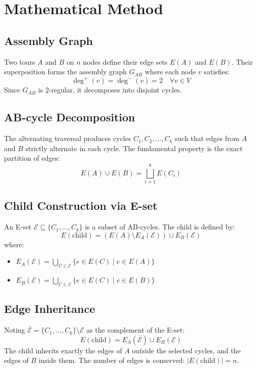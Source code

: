 \documentclass{article}
\begin{document}
\section{Mathematical Method}

\subsection{Assembly Graph}
Two tours $A$ and $B$ on $n$ nodes define their edge sets $E(A)$ and $E(B)$. Their superposition forms the assembly graph $G_{AB}$ where each node $v$ satisfies:
$$\deg^+(v) = \deg^-(v) = 2 \quad \forall v \in V$$
Since $G_{AB}$ is 2-regular, it decomposes into disjoint cycles.

\subsection{AB-cycle Decomposition}
The alternating traversal produces cycles $C_1, C_2, \dots, C_k$ such that edges from $A$ and $B$ strictly alternate in each cycle. The fundamental property is the exact partition of edges:
$$E(A) \cup E(B) = \bigsqcup_{i=1}^{k} E(C_i)$$

\subsection{Child Construction via E-set}
An E-set $\mathcal{E} \subseteq \{C_1, \dots, C_k\}$ is a subset of AB-cycles. The child is defined by:
$$E(\text{child}) = (E(A) \setminus E_A(\mathcal{E})) \cup E_B(\mathcal{E})$$
where:
\begin{itemize}
    \item $E_A(\mathcal{E}) = \bigcup_{C \in \mathcal{E}} \{e \in E(C) \mid e \in E(A)\}$
    \item $E_B(\mathcal{E}) = \bigcup_{C \in \mathcal{E}} \{e \in E(C) \mid e \in E(B)\}$
\end{itemize}

\subsection{Edge Inheritance}
Noting $\bar{\mathcal{E}} = \{C_1, \dots, C_k\} \setminus \mathcal{E}$ as the complement of the E-set:
$$E(\text{child}) = E_A(\bar{\mathcal{E}}) \cup E_B(\mathcal{E})$$
The child inherits exactly the edges of $A$ outside the selected cycles, and the edges of $B$ inside them. The number of edges is conserved: $|E(\text{child})| = n$.
\end{document}
